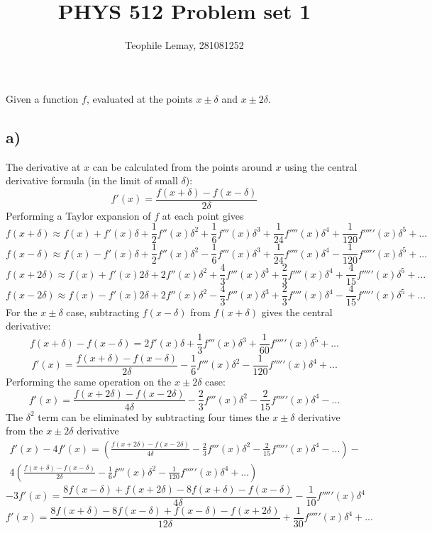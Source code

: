 \documentclass{article}
\title{PHYS 512 Problem set 1}
\author{Teophile Lemay, 281081252}
\date{}
\newcommand{\<}[1]{\left\langle #1 \right\rangle }
\begin{document}
	\maketitle
	
\section{}
Given a function $f$, evaluated at the points $x\pm\delta$ and $x\pm2\delta$.

\subsection{a)}
The derivative at $x$ can be calculated from the points around $x$ using the central derivative formula (in the limit of small $\delta$):
\[f'(x) = \frac{f(x+\delta) - f(x-\delta)}{2\delta}\]
Performing a Taylor expansion of $f$ at each point gives
\[f(x+\delta) \approx f(x) + f'(x)\delta + \frac{1}{2}f''(x)\delta^2 + \frac{1}{6}f'''(x)\delta^3 + \frac{1}{24}f''''(x)\delta^4 + \frac{1}{120}f'''''(x)\delta^5 + ...\]
\[f(x-\delta) \approx f(x) - f'(x)\delta + \frac{1}{2}f''(x)\delta^2 - \frac{1}{6}f'''(x)\delta^3 + \frac{1}{24}f''''(x)\delta^4 - \frac{1}{120}f'''''(x)\delta^5 + ...\]
\[f(x+2\delta) \approx f(x) + f'(x)2\delta + 2f''(x)\delta^2 + \frac{4}{3}f'''(x)\delta^3 + \frac{2}{3}f''''(x)\delta^4 + \frac{4}{15}f'''''(x)\delta^5 + ...\]
\[f(x-2\delta) \approx f(x) - f'(x)2\delta + 2f''(x)\delta^2 - \frac{4}{3}f'''(x)\delta^3 + \frac{2}{3}f''''(x)\delta^4 - \frac{4}{15}f'''''(x)\delta^5 + ...\]
For the $x\pm\delta$ case, subtracting $f(x-\delta)$ from $f(x+\delta)$ gives the central derivative:
\[f(x+\delta) - f(x-\delta) = 2f'(x)\delta +\frac{1}{3}f'''(x)\delta^3 + \frac{1}{60}f'''''(x)\delta^5 + ...\]
\[f'(x) = \frac{f(x+\delta) - f(x-\delta)}{2\delta}-  \frac{1}{6}f'''(x)\delta^2 - \frac{1}{120}f'''''(x)\delta^4 + ... \]
Performing the same operation on the $x\pm2\delta$ case:
\[f'(x) = \frac{f(x+2\delta) - f(x-2\delta)}{4\delta} - \frac{2}{3}f'''(x)\delta^2 - \frac{2}{15}f'''''(x)\delta^4 - ...\]
The $\delta^2$ term can be eliminated by subtracting four times the $x\pm\delta$ derivative from the $x\pm2\delta$ derivative
\begin{multline*}
	f'(x) - 4f'(x) = \left(\frac{f(x+2\delta) - f(x-2\delta)}{4\delta} - \frac{2}{3}f'''(x)\delta^2 - \frac{2}{15}f'''''(x)\delta^4 - ...\right) - \\
	4\left(\frac{f(x+\delta) - f(x-\delta)}{2\delta}-  \frac{1}{6}f'''(x)\delta^2 - \frac{1}{120}f'''''(x)\delta^4 + ...\right)
\end{multline*}
\[-3f'(x) = \frac{8f(x-\delta) + f(x+2\delta) - 8f(x+\delta) - f(x-\delta)}{4\delta} - \frac{1}{10}f'''''(x)\delta^4\]
\[\boxed{ f'(x) = \frac{8f(x+\delta) - 8f(x-\delta) + f(x-\delta) - f(x+2\delta)}{12\delta} + \frac{1}{30}f'''''(x)\delta^4 + ... }\]
\end{document}
